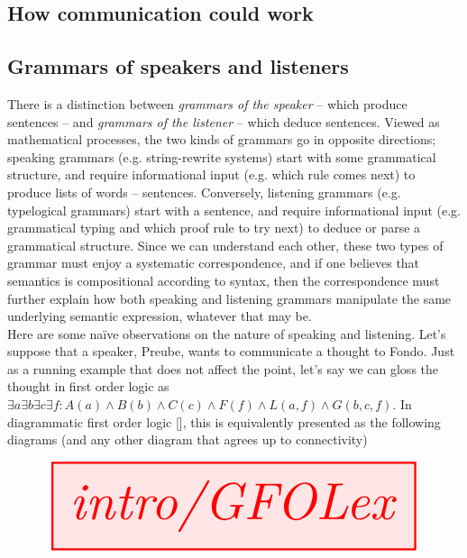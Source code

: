 \begin{fullwidth}

\section{How communication could work}

\subsection{Grammars of speakers and listeners}

There is a distinction between \emph{grammars of the speaker} -- which produce sentences -- and \emph{grammars of the listener} -- which deduce sentences. Viewed as mathematical processes, the two kinds of grammars go in opposite directions; speaking grammars (e.g. string-rewrite systems) start with some grammatical structure, and require informational input (e.g. which rule comes next) to produce lists of words -- sentences. Conversely, listening grammars (e.g. typelogical grammars) start with a sentence, and require informational input (e.g. grammatical typing and which proof rule to try next) to deduce or parse a grammatical structure. Since we can understand each other, these two types of grammar must enjoy a systematic correspondence, and if one believes that semantics is compositional according to syntax, then the correspondence must further explain how both speaking and listening grammars manipulate the same underlying semantic expression, whatever that may be.\\

Here are some na\"{i}ve observations on the nature of speaking and listening. Let's suppose that a speaker, Preube, wants to communicate a thought to Fondo. Just as a running example that does not affect the point, let's say we can gloss the thought in first order logic as $\exists a \exists b \exists c \exists f : A(a) \wedge B(b) \wedge C(c) \wedge F(f) \wedge L(a,f) \wedge G(b,c,f)$. In diagrammatic first order logic [], this is equivalently presented as the following diagrams (and any other diagram that agrees up to connectivity)

\[\resizebox{\textwidth}{!}{\tikzfig{intro/GFOLex}}\]


\end{fullwidth}
